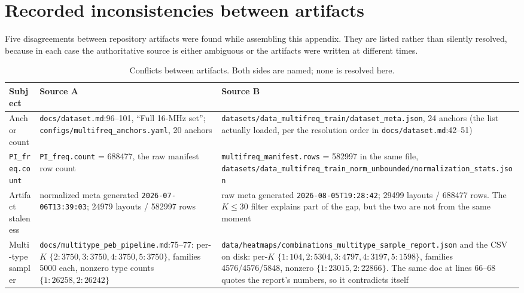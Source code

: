 \section{Recorded inconsistencies between artifacts}
\label{sec:appA_inconsistencies}

Five disagreements between repository artifacts were found while assembling this appendix. They are
listed rather than silently resolved, because in each case the authoritative source is either
ambiguous or the artifacts were written at different times.

\begin{table}[htbp]
\centering
\caption{Conflicts between artifacts. Both sides are named; none is resolved here.}
\label{tab:appA_conflicts}
\begin{tabular}{p{} p{} p{}}
\hline
Subject & Source A & Source B \\
\hline
Anchor count &
\texttt{docs/dataset.md}:96--101, ``Full 16-MHz set''; \texttt{configs/multifreq\_anchors.yaml}, 20
anchors &
\texttt{datasets/\allowbreak{}data\_\allowbreak{}multifreq\_\allowbreak{}train/\allowbreak{}dataset\_\allowbreak{}meta.json}, 24 anchors (the list actually loaded,
per the resolution order in \texttt{docs/dataset.md}:42--51) \\
\texttt{PI\_freq.count} &
\texttt{PI\_freq.count} = 688477, the raw manifest row count &
\texttt{multifreq\_manifest.rows} = 582997 in the same file,
\texttt{datasets/\allowbreak{}data\_\allowbreak{}multifreq\_\allowbreak{}train\_\allowbreak{}norm\_\allowbreak{}unbounded/\allowbreak{}normalization\_\allowbreak{}stats.json} \\
Artifact staleness &
normalized meta generated \texttt{2026-07-06T13:39:03}; 24979 layouts / 582997 rows &
raw meta generated \texttt{2026-08-05T19:28:42}; 29499 layouts / 688477 rows. The $K\le30$ filter
explains part of the gap, but the two are not from the same moment \\
Multi-type sampler &
\texttt{docs/multitype\_peb\_pipeline.md}:75--77: per-$K$ $\{2{:}3750, 3{:}3750, 4{:}3750,
5{:}3750\}$, families 5000 each, nonzero type counts $\{1{:}26258, 2{:}26242\}$ &
\texttt{data/\allowbreak{}heatmaps/\allowbreak{}combinations\_\allowbreak{}multitype\_\allowbreak{}sample\_\allowbreak{}report.json} and the CSV on disk: per-$K$
$\{1{:}104, 2{:}5304, 3{:}4797, 4{:}3197, 5{:}1598\}$, families 4576/4576/5848, nonzero
$\{1{:}23015, 2{:}22866\}$. The same doc at lines 66--68 quotes the report's numbers, so it
contradicts itself \\

\end{tabular}
\end{table}
